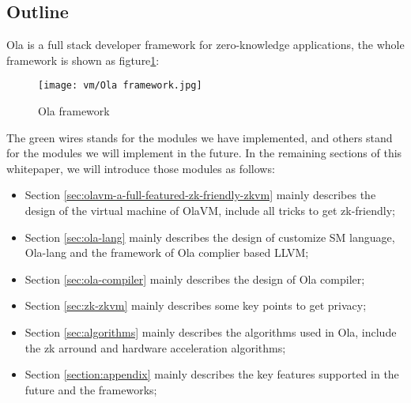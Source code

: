 \subsection{Outline}

Ola is a full stack developer framework for zero-knowledge applications, the whole framework is shown as figture\ref{fig:Ola framework}:
\begin{figure}[!ht]
    \centering
    \texttt{[image: vm/Ola framework.jpg]}
    \caption{Ola framework}
    \label{fig:Ola framework}
\end{figure}

The green wires stands for the modules we have implemented, and others stand for the modules we will implement in the future. In the remaining sections of this whitepaper, we will introduce those modules 
as follows:
\begin{itemize}
    \item Section \ref{sec:olavm-a-full-featured-zk-friendly-zkvm} mainly describes the design of the virtual machine of OlaVM, include all tricks to get zk-friendly;
    \item Section \ref{sec:ola-lang} mainly describes the design of customize SM language, Ola-lang and the framework of Ola complier based LLVM;
    \item Section \ref{sec:ola-compiler} mainly describes the design of Ola compiler;
    \item Section \ref{sec:zk-zkvm} mainly describes some key points to get privacy;
    \item Section \ref{sec:algorithms} mainly describes the algorithms used in Ola, include the zk arround and hardware acceleration algorithms;
    \item Section \ref{section:appendix} mainly describes the key features supported in the future and the frameworks;
\end{itemize}